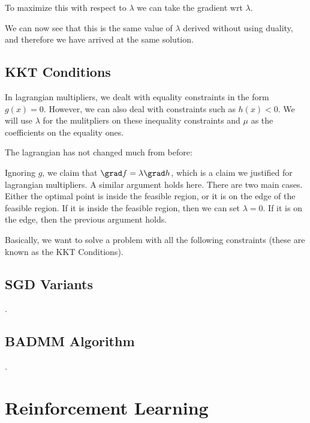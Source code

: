 \documentclass[12pt]{article}
\begin{document}
To maximize this with respect to $\lambda$ we can take the gradient wrt $\lambda$.


We can now see that this is the same value of $\lambda$ derived without using duality, and therefore we have arrived at the same solution.

\subsection{KKT Conditions}

In lagrangian multipliers, we dealt with equality constraints in the form $g(x) = 0$. However, we can also deal with constraints such as $h(x) < 0$. We will use $\lambda$ for the mulitpliers on these inequality constraints and $\mu$ as the coefficients on the equality ones.

The lagrangian has not changed much from before:


Ignoring $g$, we claim that $\grad f = \lambda \grad h$, which is a claim we justified for lagrangian multipliers. A similar argument holds here. There are two main cases. Either the optimal point is inside the feasible region, or it is on the edge of the feasible region. If it is inside the feasible region, then we can set $\lambda = 0$. If it is on the edge, then the previous argument holds.

Basically, we want to solve a problem with all the following constraints (these are known as the KKT Conditions). 


\subsection{SGD Variants}
.
\subsection{BADMM Algorithm}
.
\section{Reinforcement Learning}
\end{document}
